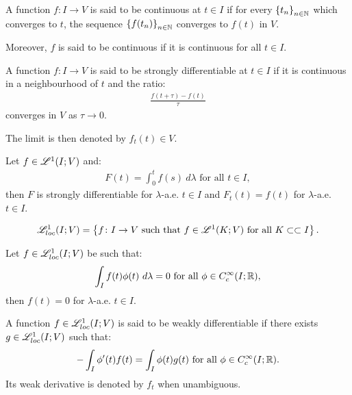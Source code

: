 \begin{definition}[Continuity]
    A function $f\colon I \rightarrow V$ is said to be continuous at $t \in I$ if for every $\left\{ t_n \right\}_{n \in \mathbb{N}}$ which converges to $t$, the sequence $\left\{ f(t_n) \right\}_{n \in \mathbb{N}}$ converges to $f(t)$ in $V$.

    Moreover, $f$ is said to be continuous if it is continuous for all $t \in I$.
\end{definition}

\begin{definition}
    A function $f\colon I \rightarrow V$ is said to be strongly differentiable at $t \in I$ if it is continuous in a neighbourhood of $t$ and the ratio:
    \begin{gather}
        \frac{f(t + \tau) - f(t)}{\tau}
    \end{gather}
    converges in $V$ as $\tau \rightarrow 0$.

    The limit is then denoted by $f_t(t) \in V$.
\end{definition}

\begin{theorem}
    Let $f \in \mathscr{L}^{1}(I; V)$ and:
    \begin{gather}
        F(t) = \int_0^t f(s) ~ d \lambda \text{ for all } t \in I,
    \end{gather}
    then $F$ is strongly differentiable for $\lambda$-a.e. $t \in I$ and $F_t(t) = f(t)$ for $\lambda$-a.e. $t \in I$.
\end{theorem}

\begin{definition}[$\Lp{1}_{loc}(I; V)$]
    \begin{gather}
        \mathscr{L}^{1}_{loc}(I; V) = \left\{ f\colon I \rightarrow V  \text{ such that } f \in \mathscr{L}^{1}(K; V) \text{ for all } K \subset \subset I \right\}.
    \end{gather}
\end{definition}

\begin{corollary}
    Let $f \in \mathscr{L}^{1}_{loc}(I; V)$ be such that:
    \begin{gather}
        \int_I f(t) \phi(t) ~ d \lambda = 0 \text{ for all } \phi \in C_c^{\infty}(I; \mathbb{R}),
    \end{gather}
    then $f(t) = 0$ for $\lambda$-a.e. $t \in I$.
\end{corollary}

\begin{definition}
    A function $f \in \mathscr{L}^{1}_{loc}(I; V)$ is said to be weakly differentiable if there exists $g \in \mathscr{L}^{1}_{loc}(I; V)$ such that:
    \begin{gather}
        - \int_I \phi^{\prime}(t) f(t) = \int_I \phi(t) g(t) \text{ for all } \phi \in C_c^{\infty}(I; \mathbb{R}).
    \end{gather}
    Its weak derivative is denoted by $f_t$ when unambiguous.
\end{definition}

